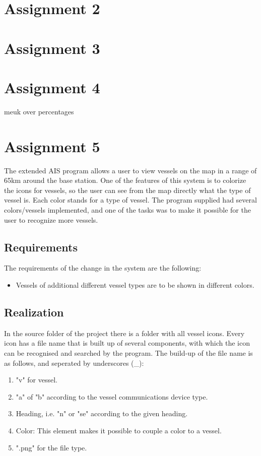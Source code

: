 \documentclass[12pt]{article}
\begin{document}
\section*{Assignment 2}

\section*{Assignment 3}

\section*{Assignment 4}
meuk over percentages

\section*{Assignment 5}
The extended AIS program allows a user to view vessels on the map in a range of 65km around the base station. One of the features of this system is to colorize the icons for vessels, so the user can see from the map directly what the type of vessel is. Each color stands for a type of vessel. The program supplied had several colors/vessels implemented, and one of the tasks was to make it possible for the user to recognize more vessels.

\subsection*{Requirements}
The requirements of the change in the system are the following:
\begin{itemize}
\item Vessels of additional different vessel types are to be shown in different colors.
\end{itemize}
\subsection*{Realization}
In the source folder of the project there is a folder with all vessel icons. Every icon has a file name that is built up of several components, with which the icon can be recognised and searched by the program. The build-up of the file name is as follows, and seperated by underscores (\_):
\\
\begin{enumerate}
\item "v" for vessel.
\item "a" of "b" according to the vessel communications device type.
\item Heading, i.e. "n" or "se" according to the given heading.
\item Color: This element makes it possible to couple a color to a vessel.
\item ".png" for the file type.
\end{enumerate}
\end{document}

